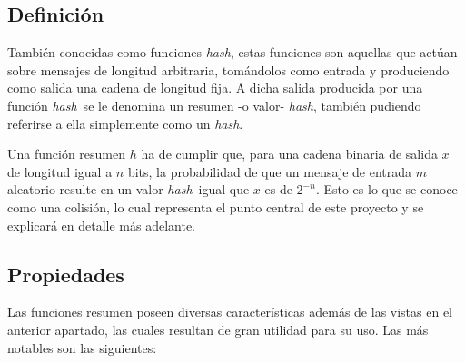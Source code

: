 \documentclass[12pt,spanish,listoffigures,listoftables,listofalgorithms]{tfgetsinf}
\newcommand{\hash}{\textit{hash}}
\begin{document}
\subsection{Definición}

También conocidas como funciones \hash, estas funciones son aquellas que actúan sobre mensajes de longitud arbitraria, tomándolos como entrada y produciendo como salida una cadena de longitud fija. A dicha salida producida por una función \hash~se le denomina un resumen -o valor- \hash, también pudiendo referirse a ella simplemente como un \hash.

Una función resumen $h$ ha de cumplir que, para una cadena binaria de salida $x$ de longitud igual a $n$ bits, la probabilidad de que un mensaje de entrada $m$ aleatorio resulte en un valor \hash~igual que $x$ es de $2^{-n}$. Esto es lo que se conoce como una colisión, lo cual representa el punto central de este proyecto y se explicará en detalle más adelante.






\subsection{Propiedades}\label{props}

Las funciones resumen poseen diversas características además de las vistas en el anterior apartado, las cuales resultan de gran utilidad para su uso. Las más notables son las siguientes:
\end{document}
